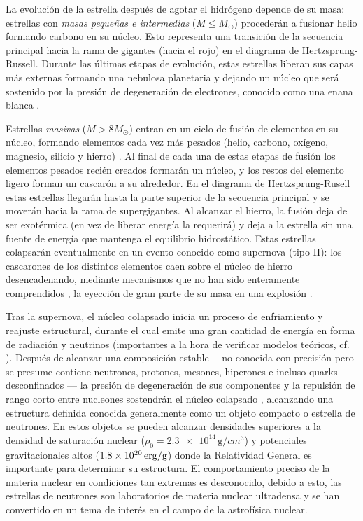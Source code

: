 La evolución de la estrella después de agotar el hidrógeno depende de su masa: estrellas con \emph{masas pequeñas e intermedias} ($M\leq M_{\odot}$) procederán a fusionar helio formando carbono en su núcleo. Esto representa una transición de la secuencia principal hacia la rama de gigantes (hacia el rojo) en el diagrama de Hertzsprung-Russell. Durante las últimas etapas de evolución, estas estrellas liberan sus capas más externas formando una nebulosa planetaria y dejando un núcleo que será sostenido por la presión de degeneración de electrones, conocido como una enana blanca \cite{Padmanabhan2000}.

Estrellas \emph{masivas} ($M>8 M_{\odot}$) entran en un ciclo de fusión de elementos en su núcleo, formando elementos cada vez más pesados (helio, carbono, oxígeno, magnesio, silicio y hierro) \cite{Glendenning2000}. Al final de cada una de estas etapas de fusión los elementos pesados recién creados formarán un núcleo, y los restos del elemento ligero forman un cascarón a su alrededor. En el diagrama de Hertzsprung-Rusell estas estrellas llegarán hasta la parte superior de la secuencia principal y se moverán hacia la rama de supergigantes. Al alcanzar el hierro, la fusión deja de ser exotérmica (en vez de liberar energía la requerirá) y deja a la estrella sin una fuente de energía que mantenga el equilibrio hidrostático. Estas estrellas colapsarán eventualmente en un evento conocido como supernova (tipo II): los cascarones de los distintos elementos caen sobre el núcleo de hierro desencadenando, mediante mecanismos que no han sido enteramente comprendidos \cite{Janka2012}, la eyección de gran parte de su masa en una explosión \cite{Woosley2005}.

Tras la supernova, el núcleo colapsado   inicia un proceso de enfriamiento y reajuste estructural, durante el cual emite una gran cantidad de energía en forma de radiación y neutrinos (importantes a la hora de verificar modelos teóricos, cf. \cite{Alvarez-Salazar2018AboutEmission}). Después de alcanzar una composición estable —no conocida con precisión pero se presume contiene neutrones, protones, mesones, hiperones e incluso quarks desconfinados \cite{Lattimer2004}— la presión de degeneración de sus componentes y la repulsión de rango corto entre nucleones sostendrán el núcleo colapsado \cite{Glendenning2000}, alcanzando una estructura definida conocida generalmente como un objeto compacto o estrella de neutrones.
En estos objetos se pueden alcanzar densidades superiores a la densidad de saturación nuclear ($\rho_0 = \num{2.3e+14}\,\si{\g/cm^3}$) y potenciales gravitacionales altos ($\num{1.8e+20}\,\rm{erg/g}$) donde la Relatividad General es importante para determinar su estructura. El comportamiento preciso de la materia nuclear en condiciones tan extremas es desconocido, debido a esto, las estrellas de neutrones son laboratorios de materia nuclear ultradensa y se han convertido en un tema de interés en el campo de la astrofísica nuclear.

